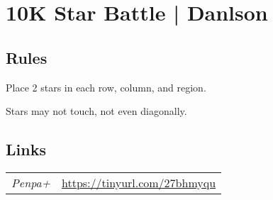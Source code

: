 \section[10K Star Battle | Danlson {[\emph{Star Battle (2*)}]}]{10K Star Battle | {\normalfont Danlson}}
\label{sec:34-10k-star-battle-danlson}

\subsection*{Rules}
\begin{markdown}
Place 2 stars in each row, column, and region.

Stars may not touch, not even diagonally.
\end{markdown}
\subsection*{Links}
\begin{tabularx}{\textwidth}{l X}
\emph{Penpa+} & \url{https://tinyurl.com/27bhmyqu} \\
\end{tabularx}
\pagebreak
